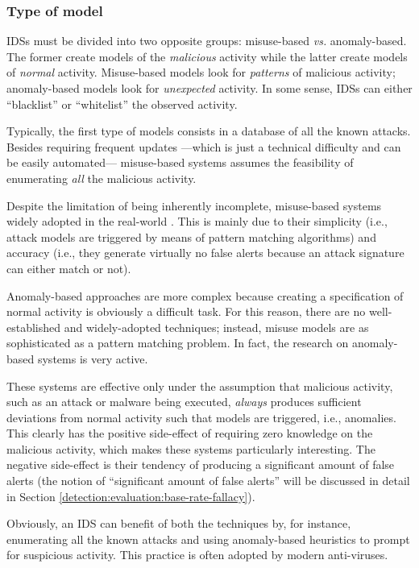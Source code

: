 \subsubsection{Type of model}
\label{sec:misuse-vs-anomaly} \acp{IDS} must be divided
into two opposite groups: misuse\hyp{}based \emph{vs.}
anomaly\hyp{}based. The former create models of the \emph{malicious}
activity while the latter create models of \emph{normal}
activity. Misuse-based models look for \emph{patterns} of malicious
activity; anomaly-based models look for \emph{unexpected} activity. In
some sense, \acp{IDS} can either ``blacklist'' or
``whitelist'' the observed activity.

Typically, the first type of models consists in a database of all the
known attacks. Besides requiring frequent updates ---which is just a
technical difficulty and can be easily automated--- misuse-based
systems assumes the feasibility of enumerating \emph{all} the
malicious activity.

Despite the limitation of being inherently incomplete, misuse-based
systems widely adopted in the real-world
\citep{snortlisa,snortsite}. This is mainly due to their simplicity
(i.e., attack models are triggered by means of pattern matching
algorithms) and accuracy (i.e., they generate virtually no false
alerts because an attack signature can either match or not).

Anomaly-based approaches are more complex because creating a
specification of normal activity is obviously a difficult task. For
this reason, there are no well-established and widely-adopted
techniques; instead, misuse models are as sophisticated as a pattern
matching problem. In fact, the research on anomaly-based systems is
very active.

These systems are effective only under the assumption that malicious
activity, such as an attack or malware being executed, \emph{always}
produces sufficient deviations from normal activity such that models
are triggered, i.e., anomalies. This clearly has the positive
side-effect of requiring zero knowledge on the malicious activity,
which makes these systems particularly interesting. The negative
side-effect is their tendency of producing a significant amount of
false alerts (the notion of ``significant amount of false alerts''
will be discussed in detail in Section
\ref{detection:evaluation:base-rate-fallacy}).

Obviously, an \ac{IDS} can benefit of both the techniques by, for
instance, enumerating all the known attacks and using anomaly-based
heuristics to prompt for suspicious activity. This practice is often
adopted by modern anti-viruses.

